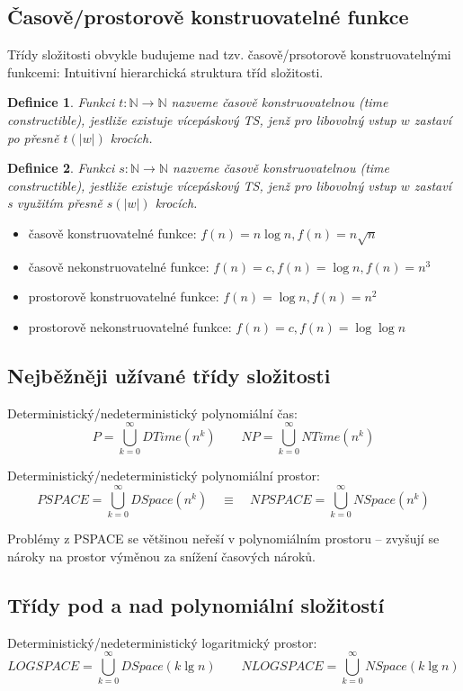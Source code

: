 \documentclass[a4paper, 11pt]{report}
\newtheorem{mydef}{Definice}[chapter]
\begin{document}
\subsection{Časově/prostorově konstruovatelné funkce}

Třídy složitosti obvykle budujeme nad tzv. časově/prsotorově konstruovatelnými funkcemi: Intuitivní hierarchická struktura tříd složitosti.

\begin{mydef}
Funkci $t: \mathbb{N} \to \mathbb{N}$ nazveme časově konstruovatelnou (time constructible), jestliže existuje vícepáskový TS, jenž pro libovolný vstup $w$ zastaví po přesně $t(|w|)$ krocích.
\end{mydef}

\begin{mydef}
Funkci $s: \mathbb{N} \to \mathbb{N}$ nazveme časově konstruovatelnou (time constructible), jestliže existuje vícepáskový TS, jenž pro libovolný vstup $w$ zastaví s využitím přesně $s(|w|)$ krocích.
\end{mydef}

\begin{itemize}
	\item časově konstruovatelné funkce: $f(n) = n \log{n}, f(n) = n \sqrt{n}$
	\item časově nekonstruovatelné funkce: $f(n) = c, f(n) = \log{n}, f(n) = n^3$
	\item prostorově konstruovatelné funkce: $f(n) = \log{n}, f(n) = n^2$
	\item prostorově nekonstruovatelné funkce: $f(n) = c, f(n) = \log{\log{n}}$
\end{itemize}

\subsection{Nejběžněji užívané třídy složitosti}

Deterministický/nedeterministický polynomiální čas:
$$P = \bigcup\limits_{k=0}^\infty DTime(n^k) \quad \quad
NP = \bigcup\limits_{k=0}^\infty NTime(n^k)$$

Deterministický/nedeterministický polynomiální prostor:
$$PSPACE = \bigcup\limits_{k=0}^\infty DSpace(n^k)
\quad \equiv \quad
NPSPACE = \bigcup\limits_{k=0}^\infty NSpace(n^k)$$

Problémy z PSPACE se většinou neřeší v polynomiálním prostoru -- zvyšují se nároky na prostor výměnou za snížení časových nároků.

\subsection{Třídy pod a nad polynomiální složitostí}
Deterministický/nedeterministický logaritmický prostor:
$$LOGSPACE = \bigcup\limits_{k=0}^\infty DSpace(k \lg{n})
\quad \quad
NLOGSPACE = \bigcup\limits_{k=0}^\infty NSpace(k \lg{n})$$
\end{document}
